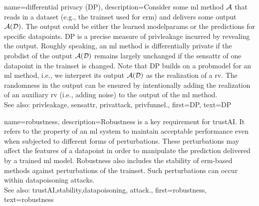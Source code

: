 {name={differential privacy (DP)},
  description={Consider some \gls{ml} method $\mathcal{A}$ 
  	that reads in a \gls{dataset} (e.g., the \gls{trainset} 
  	used for \gls{erm}) and delivers some output $\mathcal{A}(\mathcal{D})$. The output 
  	could be either the learned \glspl{modelparam} or the \glspl{prediction} for specific \glspl{datapoint}. 
  	DP is a precise measure of \gls{privleakage} incurred by revealing the 
  	output. Roughly speaking, an \gls{ml} method is differentially private if the \gls{probdist} 
  	of the output $\mathcal{A}(\mathcal{D})$ remains largely unchanged if the \gls{sensattr} 
  	of one \gls{datapoint} in the \gls{trainset} is changed. Note that DP 
  	builds on a \gls{probmodel} for an \gls{ml} method, i.e., we interpret its output $\mathcal{A}(\mathcal{D})$ 
  	as the \gls{realization} of a \gls{rv}. The randomness in the output can be ensured 
  	by intentionally adding the \gls{realization} of an auxiliary \gls{rv} (i.e., adding noise) to 
  	the output of the \gls{ml} method.
				\\ 
	See also: \gls{privleakage}, \gls{sensattr}, \gls{privattack}, \gls{privfunnel}.}, 
  first={DP}, 
  text={DP} 
}

{name={robustness},
	description={Robustness is a key requirement for \gls{trustAI}. It
		refers to the property of an \gls{ml} system to maintain acceptable performance even when 
		subjected to different forms of perturbations. These perturbations may affect the \glspl{feature} 
		of a \gls{datapoint} in order to manipulate the \gls{prediction} delivered by a trained \gls{ml} \gls{model}. 
		Robustness also includes the \gls{stability} of \gls{erm}-based methods against perturbations 
		of the \gls{trainset}. Such perturbations can occur within \gls{datapoisoning} \glspl{attack}. 
		\\ 
		See also: \gls{trustAI},\gls{stability},\gls{datapoisoning}, \gls{attack}.}, 
	first={robustness}, 
	text={robustness} 
}


